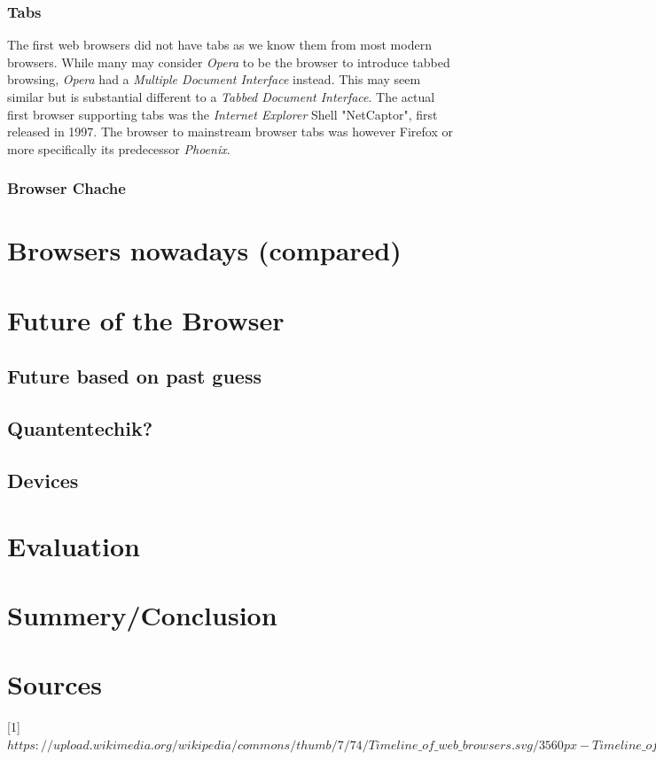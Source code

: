 \documentclass[runningheads]{llncs}
\begin{document}
			\subsubsection{Tabs}
			The first web browsers did not have tabs as we know them from most modern browsers. While many may consider \textit{Opera} to be the browser to introduce tabbed browsing, \textit{Opera} had a  \textit{Multiple Document Interface} instead. This may seem similar but is substantial different to a \textit{Tabbed Document Interface}. The actual first browser supporting tabs was the \textit{Internet Explorer} Shell "NetCaptor", first released in 1997. The browser to mainstream browser tabs was however Firefox or more specifically its predecessor \textit{Phoenix}.
			\subsubsection{Browser Chache}


	\section{Browsers nowadays (compared)}
	\section{Future of the Browser}
		\subsection{Future based on past guess}
		\subsection{Quantentechik?}
		\subsection{Devices}

	\section{Evaluation}

	\section{Summery/Conclusion}
	\section{Sources}
	[1] $https://upload.wikimedia.org/wikipedia/commons/thumb/7/74/Timeline\_of\_web\_browsers.svg/3560px-Timeline\_of\_web\_browsers.svg.png$
\end{document}

